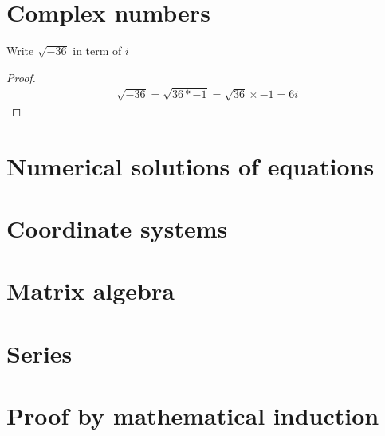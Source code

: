 \documentclass[a4paper]{article}
\begin{document}
\maketitle




\tableofcontents

\section{Complex numbers}
\begin{eg}
Write $\sqrt{-36}$ in term of $i$
\begin{proof}
\begin{align*}
\sqrt{-36}=\sqrt{36*-1}=\sqrt{36}\times -1=6i
\end{align*}
\end{proof}
\end{eg}

\section{Numerical solutions of equations}

\section{Coordinate systems}

\section{Matrix algebra}

\section{Series}

\section{Proof by mathematical induction}
\end{document}
